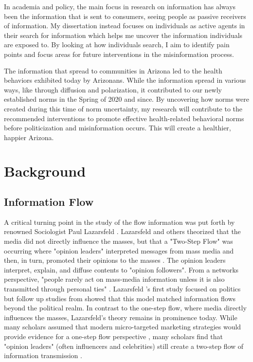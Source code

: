 In academia and policy, the main focus in research on information has always
been the information that is sent to consumers, seeing people as passive
receivers of information. My dissertation instead focuses on individuals as
active agents in their search for information which helps me uncover the
information individuals are exposed to. By looking at how individuals search, I
aim to identify pain points and focus areas for future interventions in the
misinformation process.

The information that spread to communities in Arizona led to the health
behaviors exhibited today by Arizonans. While the information spread in various
ways, like through diffusion and polarization, it contributed to our newly
established norms in the Spring of 2020 and since. By uncovering how norms were
created during this time of norm uncertainty, my research will contribute to the
recommended interventions to promote effective health-related behavioral norms
before politicization and misinformation occurs. This will create a healthier,
happier Arizona.

\section{Background}

\subsection{Information Flow}
A critical turning point in the study of the flow information was put forth by
renowned Sociologist Paul Lazarsfeld \citeyearpar{lazarsfeldPeopleChoice1944}.
Lazarsfeld and others theorized that the media did not directly influence the
masses, but that a "Two-Step Flow" was occurring where "opinion leaders"
interpreted messages from mass media and then, in turn, promoted their opinions
to the masses \citep{katzPersonalInfluencePart1955}. The opinion leaders
interpret, explain, and diffuse contents to "opinion followers". From a networks
perspective, "people rarely act on mass-media information unless it is also
transmitted through personal ties" \citep[p. 1374]{granovetterStrengthWeakTies1973}. 
Lazarsfeld \citeyearpar{lazarsfeldPeopleChoice1944}'s first study focused on
politics but follow up studies from \citep{katzPersonalInfluencePart1955} showed
that this model matched information flows beyond the political realm. In
contrast to the one-step flow, where media directly influences the masses,
Lazarsfeld's theory remains in prominence today. While many scholars assumed
that modern micro-targeted marketing strategies would provide evidence for a
one-step flow perspective \citep{bennettOneStepFlowCommunication2006}, many
scholars find that "opinion leaders" (often influencers and celebrities) still
create a two-step flow of information transmission \citep{choi15,
hilbertOneStepTwo2017}.

